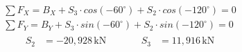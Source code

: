 \setcounter{equation}{0}
\begin{align}
  \sum F_X = B_X + S_3 \cdot cos(-60^\circ) + S_2 \cdot cos(-120^\circ) = 0\\
  \sum F_Y = B_Y + S_3 \cdot sin(-60^\circ) + S_2 \cdot sin(-120^\circ) = 0
\end{align}
\begin{align*}
  \boxed{
    \begin{aligned}
      S_2 &= -20{,}928 \, \text{kN}
  \end{aligned}}
  &\qquad
  \boxed{
    \begin{aligned}
      S_3 &= 11{,}916 \, \text{kN}
  \end{aligned}}
\end{align*}
